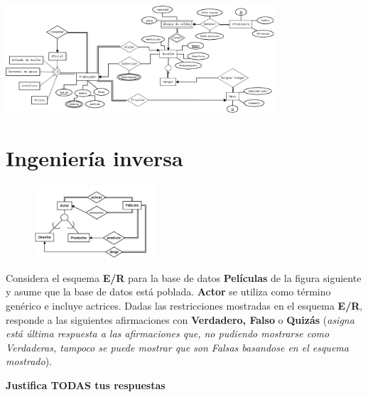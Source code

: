 \documentclass{article}
\begin{document}
\begin{enumerate}[label = (\alph*)]
{            \begin{center}
                \includegraphics[width=0.75\textwidth]{estrella-er.png}
            \end{center}  
        }
    \end{enumerate}

    \section{Ingeniería inversa}

    \begin{figure}
        \centering
        \includegraphics[width=0.40\textwidth]{peliculas-er.png}
    \end{figure}

    Considera el esquema \textbf{E/R} para la base de datos \textbf{Películas} 
    de la figura siguiente y asume que la base de datos está poblada. 
    \textbf{Actor} se utiliza como término genérico e incluye actrices. Dadas 
    las restricciones mostradas en el esquema \textbf{E/R}, responde a las 
    siguientes afirmaciones con \textbf{Verdadero, Falso} o \textbf{Quizás}
    (\textit{asigna está última respuesta a las afirmaciones que, no pudiendo 
    mostrarse como Verdaderas, tampoco se puede mostrar que son Falsas basandose
    en el esquema mostrado}).

    \textbf{Justifica TODAS tus respuestas}
\end{document}
